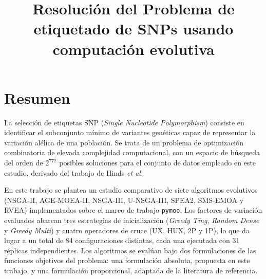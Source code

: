\documentclass[minitoc, hidelinks, headlogo, framedcover]{tfeEPCC}
\title{Resolución del Problema de etiquetado de SNPs usando computación evolutiva}
\begin{document}
\sloppy 
\pagebreak 


\pagestyle{empty}




\chapter*{Resumen}

La selección de etiquetas SNP (\textit{Single Nucleotide Polymorphism}) consiste en identificar el subconjunto mínimo de variantes genéticas capaz de representar la variación alélica de una población. Se trata de un problema de optimización combinatoria de elevada complejidad computacional, con un espacio de búsqueda del orden de $2^{772}$ posibles soluciones para el conjunto de datos empleado en este estudio, derivado del trabajo de Hinds \textit{et al.}

En este trabajo se plantea un estudio comparativo de siete algoritmos evolutivos (NSGA-II, AGE-MOEA-II, NSGA-III, U-NSGA-III, SPEA2, SMS-EMOA y RVEA) implementados sobre el marco de trabajo \texttt{pymoo}. Los factores de variación evaluados abarcan tres estrategias de inicialización (\textit{Greedy Ting}, \textit{Random Dense} y \textit{Greedy Multi}) y cuatro operadores de cruce (UX, HUX, 2P y 1P), lo que da lugar a un total de 84 configuraciones distintas, cada una ejecutada con 31 réplicas independientes. Los algoritmos se evalúan bajo dos formulaciones de las funciones objetivos del problema: una formulación absoluta, propuesta en este trabajo, y una formulación proporcional, adaptada de la literatura de referencia.
\end{document}
